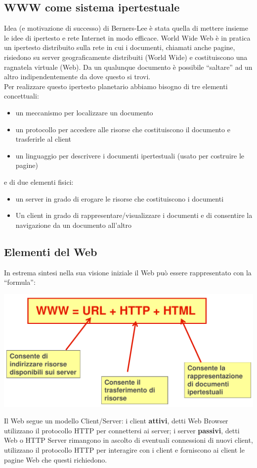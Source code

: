 \documentclass{article}
\begin{document}
\subsection{WWW come sistema ipertestuale}
Idea (e motivazione di successo) di Berners-Lee è stata quella di mettere insieme le idee di ipertesto e rete Internet in modo efficace. World Wide Web è in pratica un ipertesto distribuito sulla rete in cui i documenti, chiamati anche pagine, risiedono su server geograficamente distribuiti (World Wide) e costituiscono una ragnatela virtuale (Web). Da un qualunque documento è possibile “saltare” ad un altro indipendentemente da dove questo si trovi.
\vspace*{0.2cm}\\
Per realizzare questo ipertesto planetario abbiamo
bisogno di tre elementi concettuali:
\begin{itemize}
    \item un meccanismo per localizzare un documento     
    \item un protocollo per accedere alle risorse che costituiscono il documento e trasferirle al client
    \item un linguaggio per descrivere i documenti ipertestuali (usato per costruire le pagine)
\end{itemize}
e di due elementi fisici:
\begin{itemize}
    \item un server in grado di erogare le risorse che costituiscono i documenti
    \item Un client in grado di rappresentare/visualizzare i documenti e di consentire la navigazione da un documento all'altro
\end{itemize}



\subsection{Elementi del Web}
In estrema sintesi nella sua visione iniziale il Web può essere rappresentato con la “formula”:
\begin{center}
    \includegraphics[scale=0.27]{Images/Formula_web.png}
\end{center}
Il Web segue un modello Client/Server: i client \textbf{attivi}, detti Web Browser utilizzano il protocollo HTTP per connettersi ai server; i server \textbf{passivi}, detti Web o HTTP Server rimangono in ascolto di eventuali connessioni di nuovi client, utilizzano il protocollo HTTP per interagire con i client e forniscono ai client le pagine Web che questi richiedono.
\end{document}
